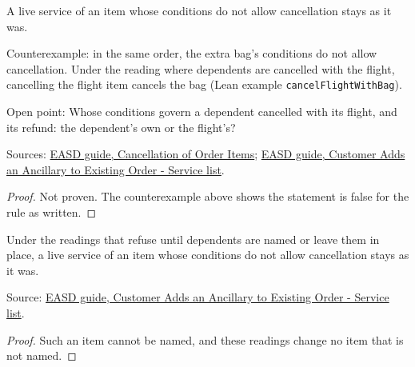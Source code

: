 \begin{theorem}
  \label{thm:ancillaries-cancel-respects-conditions}
  A live service of an item whose conditions do not allow cancellation
  stays as it was.

  Counterexample: in the same order, the extra bag's conditions do not allow
  cancellation.  Under the reading where dependents are cancelled with the
  flight, cancelling the flight item cancels the bag (Lean example
  \texttt{cancelFlightWithBag}).

  Open point: Whose conditions govern a dependent cancelled with its flight,
  and its refund: the dependent's own or the flight's?

  Sources: \href{https://standards.atlassian.net/wiki/spaces/EASD/pages/574783569}{EASD guide, Cancellation of Order Items};
  \href{https://standards.atlassian.net/wiki/spaces/EASD/pages/842301531}{EASD guide, Customer Adds an Ancillary to Existing Order - Service list}.
\end{theorem}
\begin{proof}
  Not proven.  The counterexample above shows the statement is false for the
  rule as written.
\end{proof}

\begin{theorem}
  \label{thm:ancillaries-cancel-respects-conditions-of-not-cancel-with}
  Under the readings that refuse until dependents are named or leave them in
  place, a live service of an item whose conditions do not allow
  cancellation stays as it was.

  Source: \href{https://standards.atlassian.net/wiki/spaces/EASD/pages/842301531}{EASD guide, Customer Adds an Ancillary to Existing Order - Service list}.
\end{theorem}
\begin{proof}
  Such an item cannot be named, and these readings change no item that is
  not named.
\end{proof}

